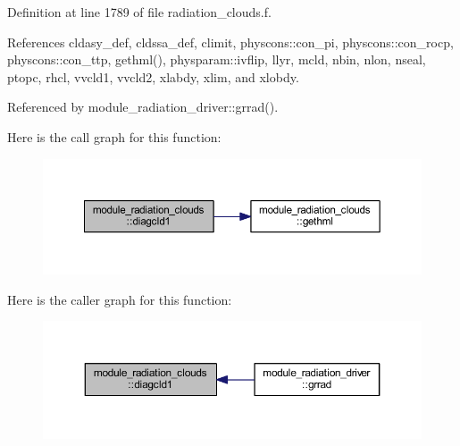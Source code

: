 Definition at line 1789 of file radiation\+\_\+clouds.\+f.



References cldasy\+\_\+def, cldssa\+\_\+def, climit, physcons\+::con\+\_\+pi, physcons\+::con\+\_\+rocp, physcons\+::con\+\_\+ttp, gethml(), physparam\+::ivflip, llyr, mcld, nbin, nlon, nseal, ptopc, rhcl, vvcld1, vvcld2, xlabdy, xlim, and xlobdy.



Referenced by module\+\_\+radiation\+\_\+driver\+::grrad().



Here is the call graph for this function\+:\nopagebreak
\begin{figure}[H]
\begin{center}
\leavevmode
\includegraphics[width=350pt]{namespacemodule__radiation__clouds_ab477be986b08fe827c44dbe352a23d39_cgraph}
\end{center}
\end{figure}




Here is the caller graph for this function\+:\nopagebreak
\begin{figure}[H]
\begin{center}
\leavevmode
\includegraphics[width=350pt]{namespacemodule__radiation__clouds_ab477be986b08fe827c44dbe352a23d39_icgraph}
\end{center}
\end{figure}


